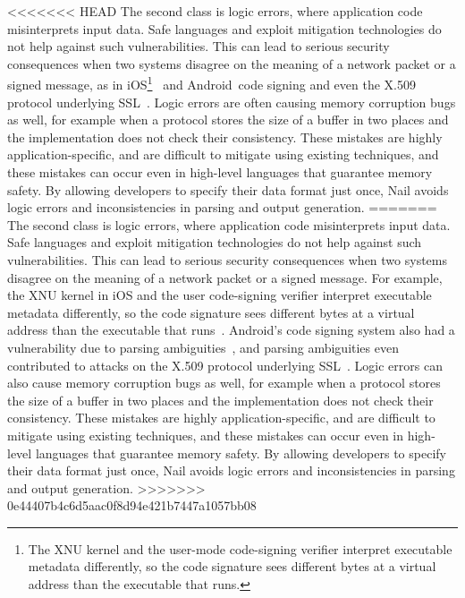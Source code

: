 <<<<<<< HEAD
The second class is logic errors, where application code misinterprets input data. Safe languages
and exploit mitigation technologies do not help against such vulnerabilities. This can lead to
serious security consequences when two systems disagree on the meaning of a network packet or a
signed message, as in iOS\footnote{The XNU kernel and the user-mode code-signing verifier interpret
  executable metadata differently, so the code signature sees different bytes at a virtual address
  than the executable that runs.}~\cite{evaders6} and Android~\cite{saurik-masterkey}code signing
and even the X.509 protocol underlying SSL~\cite{DBLP:conf/fc/KaminskyPS10}. Logic errors are often
causing memory corruption bugs as well, for example when a protocol stores the size of a buffer in
two places and the implementation does not check their consistency. These mistakes are
highly application-specific, and are difficult to mitigate using existing techniques, and these
mistakes can occur even in high-level languages that guarantee memory safety. By allowing developers
to specify their data format just once, Nail avoids logic errors and inconsistencies in parsing and
output generation.
=======
The second class is logic errors, where application code misinterprets
input data. Safe languages and exploit mitigation technologies do not
help against such vulnerabilities. This can lead to serious security
consequences when two systems disagree on the meaning of a network
packet or a signed message.  For example, the XNU kernel in iOS and the
user code-signing verifier interpret executable metadata differently,
so the code signature sees different bytes at a virtual address than the
executable that runs~\cite{evaders6}.  Android's code signing system also
had a vulnerability due to parsing ambiguities~\cite{saurik-masterkey},
and parsing ambiguities even contributed to attacks on the X.509 protocol
underlying SSL~\cite{DBLP:conf/fc/KaminskyPS10}.  Logic errors can also
cause memory corruption bugs as well, for example when a protocol stores
the size of a buffer in two places and the implementation does not check
their consistency. These mistakes are highly application-specific, and
are difficult to mitigate using existing techniques, and these mistakes
can occur even in high-level languages that guarantee memory safety. By
allowing developers to specify their data format just once, Nail avoids
logic errors and inconsistencies in parsing and output generation.
>>>>>>> 0e44407b4c6d5aac0f8d94e421b7447a1057bb08

